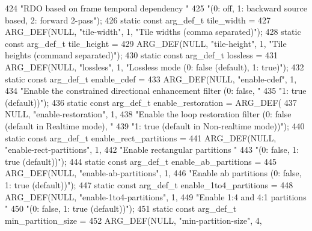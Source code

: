 \begin{DoxyCodeInclude}
{{{{{{{424             \textcolor{stringliteral}{"RDO based on frame temporal dependency "}
425             \textcolor{stringliteral}{"(0: off, 1: backward source based, 2: forward 2-pass"});
426 \textcolor{keyword}{static} \textcolor{keyword}{const} arg\_def\_t tile\_width =
427     ARG\_DEF(NULL, \textcolor{stringliteral}{"tile-width"}, 1, \textcolor{stringliteral}{"Tile widths (comma separated)"});
428 \textcolor{keyword}{static} \textcolor{keyword}{const} arg\_def\_t tile\_height =
429     ARG\_DEF(NULL, \textcolor{stringliteral}{"tile-height"}, 1, \textcolor{stringliteral}{"Tile heights (command separated)"});
430 \textcolor{keyword}{static} \textcolor{keyword}{const} arg\_def\_t lossless =
431     ARG\_DEF(NULL, \textcolor{stringliteral}{"lossless"}, 1, \textcolor{stringliteral}{"Lossless mode (0: false (default), 1: true)"});
432 \textcolor{keyword}{static} \textcolor{keyword}{const} arg\_def\_t enable\_cdef =
433     ARG\_DEF(NULL, \textcolor{stringliteral}{"enable-cdef"}, 1,
434             \textcolor{stringliteral}{"Enable the constrained directional enhancement filter (0: false, "}
435             \textcolor{stringliteral}{"1: true (default))"});
436 \textcolor{keyword}{static} \textcolor{keyword}{const} arg\_def\_t enable\_restoration = ARG\_DEF(
437     NULL, \textcolor{stringliteral}{"enable-restoration"}, 1,
438     \textcolor{stringliteral}{"Enable the loop restoration filter (0: false (default in Realtime mode), "}
439     \textcolor{stringliteral}{"1: true (default in Non-realtime mode))"});
440 \textcolor{keyword}{static} \textcolor{keyword}{const} arg\_def\_t enable\_rect\_partitions =
441     ARG\_DEF(NULL, \textcolor{stringliteral}{"enable-rect-partitions"}, 1,
442             \textcolor{stringliteral}{"Enable rectangular partitions "}
443             \textcolor{stringliteral}{"(0: false, 1: true (default))"});
444 \textcolor{keyword}{static} \textcolor{keyword}{const} arg\_def\_t enable\_ab\_partitions =
445     ARG\_DEF(NULL, \textcolor{stringliteral}{"enable-ab-partitions"}, 1,
446             \textcolor{stringliteral}{"Enable ab partitions (0: false, 1: true (default))"});
447 \textcolor{keyword}{static} \textcolor{keyword}{const} arg\_def\_t enable\_1to4\_partitions =
448     ARG\_DEF(NULL, \textcolor{stringliteral}{"enable-1to4-partitions"}, 1,
449             \textcolor{stringliteral}{"Enable 1:4 and 4:1 partitions "}
450             \textcolor{stringliteral}{"(0: false, 1: true (default))"});
451 \textcolor{keyword}{static} \textcolor{keyword}{const} arg\_def\_t min\_partition\_size =
452     ARG\_DEF(NULL, \textcolor{stringliteral}{"min-partition-size"}, 4,
}}}}}}}
\end{DoxyCodeInclude}
